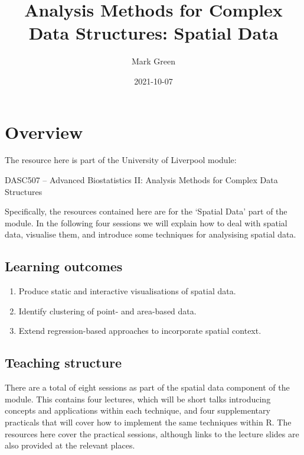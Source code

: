 \documentclass[
]{book}
\title{Analysis Methods for Complex Data Structures: Spatial Data}
\author{Mark Green}
\date{2021-10-07}
\providecommand{\tightlist}{%
  \setlength{\itemsep}{0pt}\setlength{\parskip}{0pt}}
\begin{document}
\maketitle

{
\setcounter{tocdepth}{1}
\tableofcontents
}
\hypertarget{overview}{%
\chapter*{Overview}\label{overview}}

The resource here is part of the University of Liverpool module:

DASC507 -- Advanced Biostatistics II: Analysis Methods for Complex Data Structures

Specifically, the resources contained here are for the `Spatial Data' part of the module. In the following four sessions we will explain how to deal with spatial data, visualise them, and introduce some techniques for analysising spatial data.

\hypertarget{learning-outcomes}{%
\section*{Learning outcomes}\label{learning-outcomes}}

\begin{enumerate}
\def\labelenumi{\arabic{enumi}.}
\tightlist
\item
  Produce static and interactive visualisations of spatial data.
\item
  Identify clustering of point- and area-based data.
\item
  Extend regression-based approaches to incorporate spatial context.
\end{enumerate}

\hypertarget{teaching-structure}{%
\section*{Teaching structure}\label{teaching-structure}}

There are a total of eight sessions as part of the spatial data component of the module. This contains four lectures, which will be short talks introducing concepts and applications within each technique, and four supplementary practicals that will cover how to implement the same techniques within R. The resources here cover the practical sessions, although links to the lecture slides are also provided at the relevant places.
\end{document}
